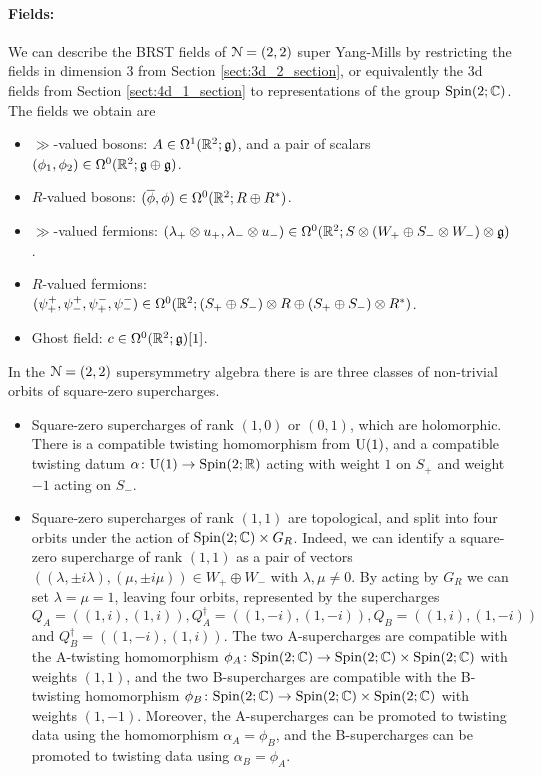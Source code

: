 \documentclass[10pt, oneside]{article}
\begin{document}
\paragraph{Fields:} We can describe the BRST fields of $\mathcal{N}=(2,2)$ super Yang-Mills by restricting the fields in dimension 3 from Section \ref{sect:3d_2_section}, or equivalently the 3d fields from Section \ref{sect:4d_1_section} to representations of the group $\mathrm{Spin}(2;\mathbb C)$.  The fields we obtain are
\begin{itemize}
 \item $\gg$-valued bosons: $A \in \Omega^1(\mathbb R^2; \mathfrak{g})$, and a pair of scalars $(\phi_1,\phi_2) \in \Omega^0(\mathbb R^2; \mathfrak{g} \oplus \mathfrak{g})$.
 \item $R$-valued bosons: $(\overline{\phi}, \phi) \in \Omega^0(\mathbb R^2 ; R \oplus R^*)$.
 \item $\gg$-valued fermions: $(\lambda_+ \otimes u_+,\lambda_- \otimes u_-) \in \Omega^0(\mathbb R^2 ; S \otimes (W_+ \oplus S_- \otimes W_-) \otimes \mathfrak{g})$.
 \item $R$-valued fermions: $(\psi^+_+,\psi^+_-, \psi^-_+, \psi^-_-) \in \Omega^0(\mathbb R^2 ; (S_+ \oplus S_-) \otimes R \oplus (S_+ \oplus S_-) \otimes R^*)$.
 \item Ghost field: $c \in \Omega^0(\mathbb R^2; \mathfrak{g})[1]$.
\end{itemize}

In the $\mathcal{N}=(2,2)$ supersymmetry algebra there is are three classes of non-trivial orbits of square-zero supercharges.  
\begin{itemize}
 \item Square-zero supercharges of rank $(1,0)$ or $(0,1)$, which are holomorphic.  There is a compatible twisting homomorphism from $\mathrm{U}(1)$, and a compatible twisting datum $\alpha \colon \mathrm{U}(1) \to \mathrm{Spin}(2;\mathbb R)$ acting with weight $1$ on $S_+$ and weight $-1$ acting on $S_-$.  
 \item Square-zero supercharges of rank $(1,1)$ are topological, and split into four orbits under the action of $\mathrm{Spin}(2;\mathbb C) \times G_R$.  Indeed, we can identify a square-zero supercharge of rank $(1,1)$ as a pair of vectors $((\lambda, \pm i \lambda), (\mu, \pm i \mu)) \in W_+ \oplus W_-$ with $\lambda, \mu \ne 0$.  By acting by $G_R$ we can set $\lambda = \mu = 1$, leaving four orbits, represented by the supercharges $Q_A = ((1,i),(1,i)), Q_A^\dagger = ((1,-i),(1,-i)), Q_B = ((1,i),(1,-i))$ and $Q_B^\dagger = ((1,-i),(1,i))$.  The two A-supercharges are compatible with the A-twisting homomorphism $\phi_{A} \colon \mathrm{Spin}(2;\mathbb C) \to \mathrm{Spin}(2;\mathbb C) \times \mathrm{Spin}(2;\mathbb C)$ with weights $(1,1)$, and the two B-supercharges are compatible with the B-twisting homomorphism $\phi_{B} \colon \mathrm{Spin}(2;\mathbb C) \to \mathrm{Spin}(2;\mathbb C) \times \mathrm{Spin}(2;\mathbb C)$ with weights $(1,-1)$.  Moreover, the A-supercharges can be promoted to twisting data using the homomorphism $\alpha_A = \phi_B$, and the B-supercharges can be promoted to twisting data using $\alpha_B = \phi_A$.
\end{itemize}
\end{document}
